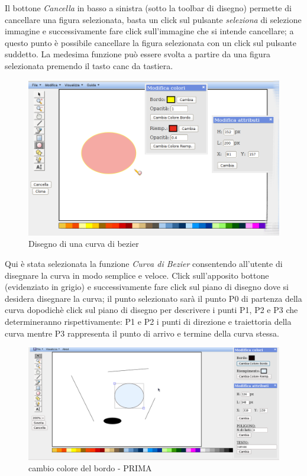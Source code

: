 \vspace{100pt}
Il bottone \textit{Cancella} in basso a sinistra (sotto la toolbar di disegno) permette di cancellare una figura selezionata, 
basta un click sul pulsante \textit{seleziona} di selezione immagine e successivamente fare click sull'immagine che si intende cancellare; a questo punto \`e possibile cancellare la figura selezionata con un click sul pulsante suddetto. La medesima funzione può essere svolta a partire da una figura selezionata premendo il tasto canc da tastiera.

\begin{figure}[!ht]
\centering
\includegraphics[scale=4]{images/ellisse.png}
\caption{Disegno di una curva di bezier}
\end{figure} 

\vspace{100pt}
Qui \`e stata selezionata la funzione \textit{Curva di Bezier} consentendo all'utente di disegnare la curva in modo semplice e veloce.
Click sull'apposito bottone (evidenziato in grigio)  e successivamente fare click sul piano di disegno dove si desidera disegnare la curva; il punto selezionato sar\`a il punto P0 di partenza della curva dopodich\`e click sul piano di disegno per descrivere i punti P1, P2 e P3 che determineranno rispettivamente: P1 e P2 i punti di direzione e traiettoria della curva mentre P3 rappresenta il punto di arrivo e termine della curva stessa.

\begin{figure}[!ht]
\centering
\includegraphics[scale=4]{images/colore_bordo_prima.png}
\caption{cambio colore del bordo  - PRIMA}
\end{figure} 

